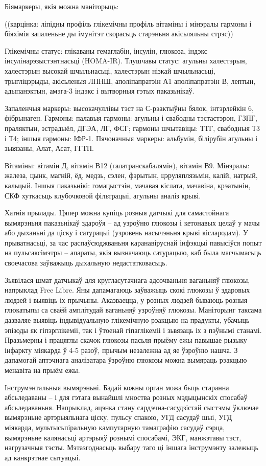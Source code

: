 Біямаркеры, якія можна маніторыць:

((карцінка: ліпідны профіль глікемічны профіль вітаміны і мінэралы гармоны і біяхімія запаленьне ды імунітэт скорасьць старэньня акісьляльны стрэс))

Глікемічны статус: глікаваны гемаглабін, інсулін, глюкоза, індэкс інсулінарэзыстэнтнасьці (HOMA-IR). Тлушчавы статус: агульны халестэрын, халестэрын высокай шчыльнасьці, халестэрын нізкай шчыльнасьці, трыгліцэрыды, акісьленыя ЛПНШ, аполіпапратэін А1 аполіпапратэін В, лептын, адыпанэктын, амэга-3 індэкс і вытворныя гэтых паказьнікаў.

Запаленчыя маркеры: высокачуллівы тэст на С-рэактыўны бялок, інтэрлейкін 6, фібрынаген. Гармоны: палавыя гармоны: агульны і свабодны тэстастэрон, ГЗПГ, праляктын, эстрадыёл, ДГЭА, ЛГ, ФСГ; гармоны шчытавіцы: ТТГ, свабодныя Т3 і Т4; іншыя гармоны: ІФР-1. Пячоначныя маркеры: альбумін, білірубін агульны і зьвязаны, Алат, Асат, ГГТП.

Вітаміны: вітамін Д, вітамін В12 (галатранскабалямін), вітамін В9. Мінэралы: жалеза, цынк, магній, ёд, медзь, сэлен, фэрытын, цэруляплязьмін, калій, натрый, кальцый. Іншыя паказьнікі: гомацыстэін, мачавая кіслата, мачавіна, крэатынін, СКФ хуткасьць клубочковой фільтрацыі, агульны аналіз крыві.

Хатнія прылады. Цяпер можна купіць розныя датчыкі для самастойнага вымярэньня паказьнікаў здароўя – ад узроўню глюкозы і кетонавых целаў у мачы або дыханьні да ціску і сатурацыі (узровень насычэньня крыві кіслародам). У прыватнасьці, за час распаўсюджваньня каранавіруснай інфэкцыі павысіўся попыт на пульсаксімэтры – апараты, якія вызначаюць сатурацыю, каб была магчымасьць своечасова заўважыць дыхальную недастатковасьць.

Зьявілася шмат датчыкаў для кругласутачнага адсочваньня ваганьняў глюкозы, напрыклад Free Libre. Яны дапамагаюць заўважыць скокі глюкозы ў здаровых людзей і выявіць іх прычыны. Аказваецца, у розных людзей бываюць розныя глюкатыпы са сваёй амплітудай ваганьняў узроўняў глюкозы. Маніторынг таксама дазваляе выявіць індывідуальную глікемічную рэакцыю на прадукты, убачыць эпізоды як гіпэрглікеміі, так і ўтоенай гіпаглікеміі і зьвязаць іх з пэўнымі станамі. Празьмерны і працяглы скачок глюкозы пасьля прыёму ежы павышае рызыку інфаркту міякарда ў 4-5 разоў, прычым незалежна ад яе ўзроўню нашча. З дапамогай аптэчнага аналізатара ўзроўню глюкозы можна вымяраць рэакцыю менавіта на прыём ежы.

Інструмэнтальныя вымярэньні. Бадай кожны орган можа быць старанна абсьледаваны – і для гэтага вынайшлі мноства розных мэдыцынскіх спосабаў абсьледаваньня. Напрыклад, ацэнка стану сардэчна-сасудзістай сыстэмы ўключае вымярэньне артэрыяльнага ціску, пульсу спакою, УГД сасудаў шыі, УГД міякарда, мультысьпіральную кампутарную тамаграфію сасудаў сэрца, вымярэньне калянасьці артэрыяў рознымі спосабамі, ЭКГ, манжэтавы тэст, нагрузачныя тэсты. Мэтазгоднасьць выбару таго ці іншага інструмэнту залежыць ад канкрэтнае сытуацыі.

